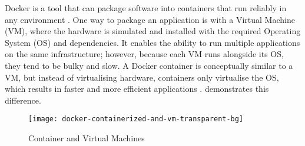Docker is a tool that can package software into containers that run reliably in
any environment \cite{docker-runtime}. One way to package an application is
with a Virtual Machine (VM), where the hardware is simulated and installed with
the required Operating System (OS) and dependencies. It enables the ability to
run multiple applications on the same infrastructure; however, because each VM
runs alongside its OS, they tend to be bulky and slow. A Docker container is
conceptually similar to a VM, but instead of virtualising hardware, containers
only virtualise the OS, which results in faster and more efficient applications
\cite{docker-container-vm}.  demonstrates this
difference.

\begin{figure*}[!htb]
  \caption{Container and Virtual Machines}
  \label{fig:docker_container_vm}
  \centering
  \texttt{[image: docker-containerized-and-vm-transparent-bg]}
\end{figure*}
